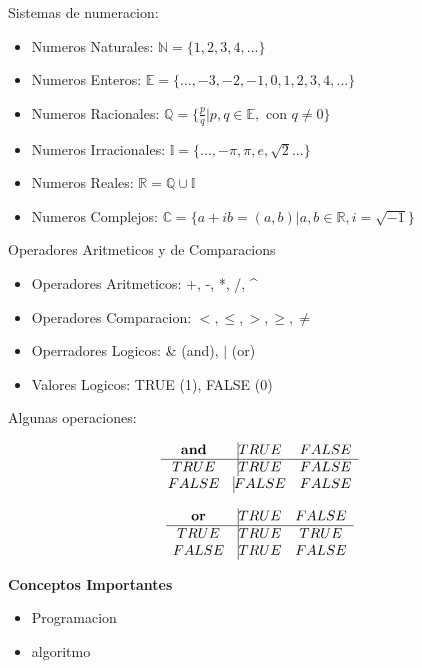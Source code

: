 \begin{frame}
Sistemas de numeracion:

\begin{itemize}
\item Numeros Naturales: $\mathbb{N} = \{1, 2, 3, 4, ...\}$
\item Numeros Enteros: $\mathbb{E} = \{..., -3, -2, -1, 0, 1, 2, 3, 4, ...\}$
\item Numeros Racionales: $\mathbb{Q} = \{ \frac{p}{q} | p,q \in \mathbb{E}, \text{ con } q \neq 0 \}$
\item Numeros Irracionales: $\mathbb{I} = \{ ..., -\pi, \pi, e, \sqrt{2} ... \}$  
\item Numeros Reales: $\mathbb{R} = \mathbb{Q} \cup \mathbb{I} $
\item Numeros Complejos: $\mathbb{C} = \{ a+ ib = (a,b) | a, b \in \mathbb{R}, i=\sqrt{-1} \}$  
\end{itemize}
\end{frame}

\begin{frame}
Operadores Aritmeticos y de Comparacions

\begin{itemize}
\item Operadores Aritmeticos: +, -, *, /, \^
\item Operadores Comparacion: $<, \leq, >, \geq, \neq$ 
\item Operradores Logicos: \& (and), $|$ (or)
\item Valores Logicos: TRUE (1), FALSE (0)
\end{itemize}


\end{frame}

\begin{frame}

Algunas operaciones:

$$
\begin{matrix}
\textbf{and} & \vline  TRUE  & FALSE \\
\hline
TRUE & \vline  TRUE &  FALSE \\
FALSE & \vline FALSE & FALSE
\end{matrix}
$$


$$
\begin{matrix}
\textbf{or} & \vline  TRUE  & FALSE \\
\hline
TRUE & \vline  TRUE &  TRUE \\
FALSE & \vline TRUE & FALSE
\end{matrix}
$$


\end{frame}

\begin{frame}

\textbf{Conceptos Importantes}

\begin{itemize}
\item Programacion
\item algoritmo
\end{itemize}

\end{frame}



